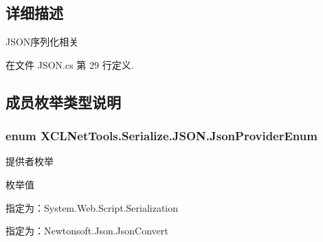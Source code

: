 \subsection{详细描述}
J\-S\-O\-N序列化相关 



在文件 J\-S\-O\-N.\-cs 第 29 行定义.



\subsection{成员枚举类型说明}
\hypertarget{class_x_c_l_net_tools_1_1_serialize_1_1_j_s_o_n_acb00f7258e4dedfaa0cec15ce9335a31}{
\subsubsection[{Json\-Provider\-Enum}]{\setlength{\rightskip}{0pt plus 5cm}enum {\bf X\-C\-L\-Net\-Tools.\-Serialize.\-J\-S\-O\-N.\-Json\-Provider\-Enum}}}\label{class_x_c_l_net_tools_1_1_serialize_1_1_j_s_o_n_acb00f7258e4dedfaa0cec15ce9335a31}


提供者枚举 

\begin{Desc}
\item[枚举值]\par
\begin{description}
\item[{\em 
\hypertarget{class_x_c_l_net_tools_1_1_serialize_1_1_j_s_o_n_acb00f7258e4dedfaa0cec15ce9335a31a67a1b1b70420ea0e3be332a9dedcb83e}{System\-Web}\label{class_x_c_l_net_tools_1_1_serialize_1_1_j_s_o_n_acb00f7258e4dedfaa0cec15ce9335a31a67a1b1b70420ea0e3be332a9dedcb83e}
}]指定为：\-System.\-Web.\-Script.\-Serialization \item[{\em 
\hypertarget{class_x_c_l_net_tools_1_1_serialize_1_1_j_s_o_n_acb00f7258e4dedfaa0cec15ce9335a31a3dae1400047ce0f8033b4d8f2815fc92}{Newtonsoft}\label{class_x_c_l_net_tools_1_1_serialize_1_1_j_s_o_n_acb00f7258e4dedfaa0cec15ce9335a31a3dae1400047ce0f8033b4d8f2815fc92}
}]指定为：\-Newtonsoft.\-Json.\-Json\-Convert \end{description}
\end{Desc}


